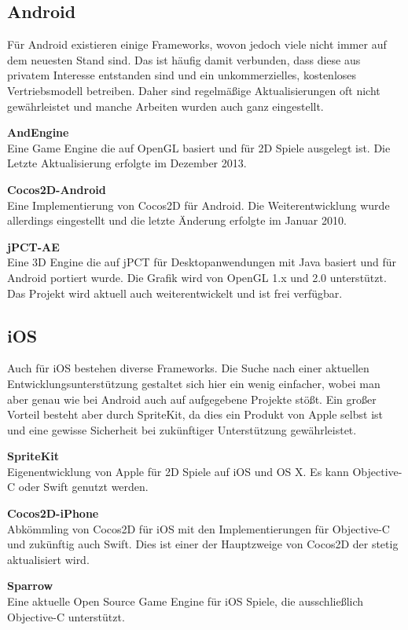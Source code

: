\subsection{Android}
Für Android existieren einige Frameworks, wovon jedoch viele nicht immer auf dem neuesten Stand sind. Das ist häufig damit verbunden, dass diese aus privatem Interesse entstanden sind und ein unkommerzielles, kostenloses Vertriebsmodell betreiben. Daher sind regelmäßige Aktualisierungen oft nicht gewährleistet und manche Arbeiten wurden auch ganz eingestellt.

\bigskip
\textbf{AndEngine}\\
Eine Game Engine die auf OpenGL basiert und für 2D Spiele ausgelegt ist.
Die Letzte Aktualisierung erfolgte im Dezember 2013.

\bigskip
\textbf{Cocos2D-Android}\\
Eine Implementierung von Cocos2D für Android. Die Weiterentwicklung wurde allerdings eingestellt und die letzte Änderung erfolgte im Januar 2010.

\bigskip
\textbf{jPCT-AE}\\
Eine 3D Engine die auf jPCT für Desktopanwendungen mit Java basiert und für Android portiert wurde. Die Grafik wird von OpenGL 1.x und 2.0 unterstützt. Das Projekt wird aktuell auch weiterentwickelt und ist frei verfügbar.

\subsection{iOS}
Auch für iOS bestehen diverse Frameworks. Die Suche nach einer aktuellen Entwicklungsunterstützung gestaltet sich hier ein wenig einfacher, wobei man aber genau wie bei Android auch auf aufgegebene Projekte stößt. Ein großer Vorteil besteht aber durch SpriteKit, da dies ein Produkt von Apple selbst ist und eine gewisse Sicherheit bei zukünftiger Unterstützung gewährleistet.

\bigskip
\textbf{SpriteKit}\\
Eigenentwicklung von Apple für 2D Spiele auf iOS und OS X. Es kann Objective-C oder Swift genutzt werden.

\bigskip
\textbf{Cocos2D-iPhone}\\
Abkömmling von Cocos2D für iOS mit den Implementierungen für Objective-C und zukünftig auch Swift. Dies ist einer der Hauptzweige von Cocos2D der stetig aktualisiert wird.

\bigskip
\textbf{Sparrow}\\
Eine aktuelle Open Source Game Engine für iOS Spiele, die ausschließlich Objective-C unterstützt.

